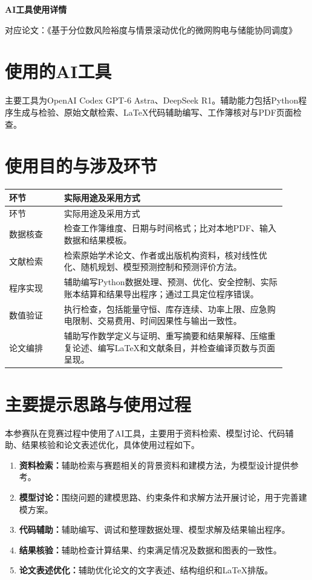 \documentclass[UTF8,a4paper,zihao=-4,fontset=none]{ctexart}
\begin{document}
\begin{center}{\LARGE\bfseries AI工具使用详情}\end{center}
\begin{center}对应论文：《基于分位数风险裕度与情景滚动优化的微网购电与储能协同调度》\end{center}

\section{使用的AI工具}
主要工具为OpenAI Codex GPT-6 Astra、DeepSeek R1。辅助能力包括Python程序生成与检验、原始文献检索、LaTeX代码辅助编写、工作簿核对与PDF页面检查。
\section{使用目的与涉及环节}
\begin{longtable}{p{0.18\linewidth}p{0.73\linewidth}}
\toprule 环节&实际用途及采用方式\\\midrule\endfirsthead
\toprule 环节&实际用途及采用方式\\\midrule\endhead
数据核查&检查工作簿维度、日期与时间格式；比对本地PDF、输入数据和结果模板。\\
文献检索&检索原始学术论文、作者或出版机构资料，核对线性优化、随机规划、模型预测控制和预测评价方法。\\
程序实现&辅助编写Python数据处理、预测、优化、安全控制、实际账本结算和结果导出程序；通过工具定位程序错误。\\
数值验证&执行检查，包括能量守恒、库存连续、功率上限、应急购电限制、交易费用、时间因果性与输出一致性。\\
论文编排&辅助写作数学定义与证明、重写摘要和结果解释、压缩重复论述、编写LaTeX和文献条目，并检查编译页数与页面呈现。\\
\bottomrule
\end{longtable}

\section{主要提示思路与使用过程}
本参赛队在竞赛过程中使用了AI工具，主要用于资料检索、模型讨论、代码辅助、结果核验和论文表述优化，具体使用过程如下。

\begin{enumerate}
\item \textbf{资料检索：}辅助检索与赛题相关的背景资料和建模方法，为模型设计提供参考。
\item \textbf{模型讨论：}围绕问题的建模思路、约束条件和求解方法开展讨论，用于完善建模方案。
\item \textbf{代码辅助：}辅助编写、调试和整理数据处理、模型求解及结果输出程序。
\item \textbf{结果核验：}辅助检查计算结果、约束满足情况及数据和图表的一致性。
\item \textbf{论文表述优化：}辅助优化论文的文字表述、结构组织和\LaTeX{}排版。
\end{enumerate}
\end{document}
